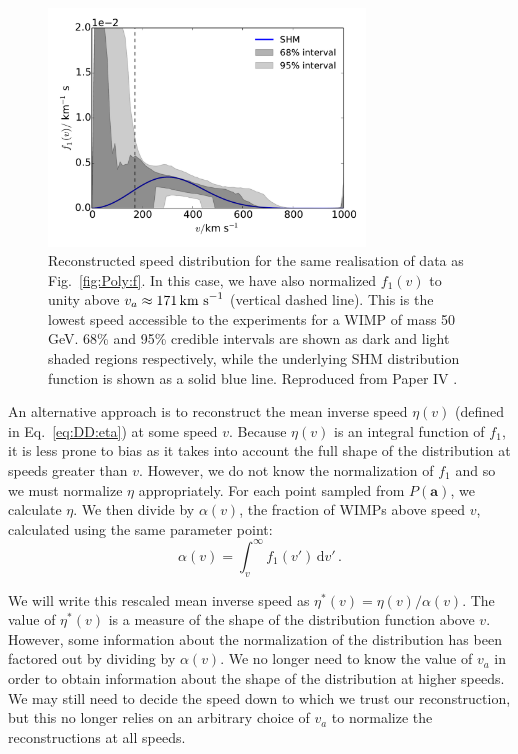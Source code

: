 \begin{figure}[t]
\centering
  \includegraphics[width=0.75\textwidth]{Poly/f_SHM_scaled_line.pdf}
  \caption[Rescaled reconstructed speed distribution for a single realisation of data using the polynomial $\ln f(v)$ parametrisation]{Reconstructed speed distribution for the same realisation of data as Fig.~\ref{fig:Poly:f}. In this case, we have also normalized $f_1(v)$ to unity above $v_a \approx 171 \,\textrm{km s}^{-1}$ (vertical dashed line). This is the lowest speed accessible to the experiments for a WIMP of mass 50 GeV. 68\% and 95\% credible intervals are shown as dark and light shaded regions respectively, while the underlying SHM distribution function is shown as a solid blue line. Reproduced from Paper IV \cite{Kavanagh:2014}.}
  \label{fig:Poly:f_scaled}
\end{figure}

An alternative approach is to reconstruct the mean inverse speed $\eta(v)$ (defined in Eq.~\ref{eq:DD:eta}) at some speed $v$. Because $\eta(v)$ is an integral function of $f_1$, it is less prone to bias as it takes into account the full shape of the distribution at speeds greater than $v$. However, we do not know the normalization of $f_1$ and so we must normalize $\eta$ appropriately. For each point sampled from $P(\textbf{a})$, we calculate $\eta$. We then divide by $\alpha(v)$, the fraction of WIMPs above speed $v$, calculated using the same parameter point:
\begin{equation}
\label{eq:alpha}
\alpha(v) = \int_{v}^{\infty} f_1(v') \, \textrm{d}v'\,.
\end{equation}

We will write this rescaled mean inverse speed as $\eta^*(v) = \eta(v)/\alpha(v)$. The value of $\eta^*(v)$ is a measure of the shape of the distribution function above $v$. However, some information about the normalization of the distribution has been factored out by dividing by $\alpha(v)$. We no longer need to know the value of $v_a$ in order to obtain information about the shape of the distribution at higher speeds. We may still need to decide the speed down to which we trust our reconstruction, but this no longer relies on an arbitrary choice of $v_a$ to normalize the reconstructions at all speeds.

